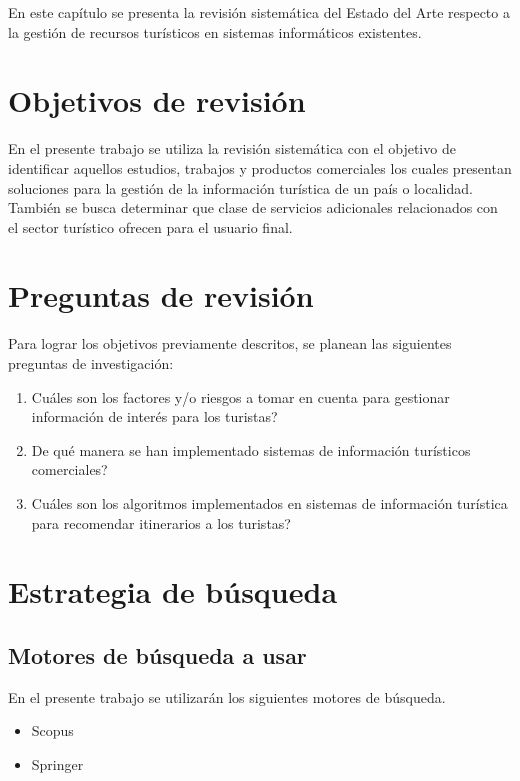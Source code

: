 \documentclass{report}
\begin{document}
En este capítulo se presenta la revisión sistemática del Estado del Arte
respecto a la gestión de recursos turísticos en sistemas informáticos existentes.

\section{Objetivos de revisión}

En el presente trabajo se utiliza la revisión sistemática con el objetivo de
identificar aquellos estudios, trabajos y productos comerciales los cuales presentan
soluciones para la gestión de la información turística de un país o localidad.
También se busca determinar que clase de servicios adicionales relacionados
con el sector turístico ofrecen para el usuario final.

\section{Preguntas de revisión}

Para lograr los objetivos previamente descritos, se planean las siguientes preguntas
de investigación:

\begin{enumerate}
    \item{Cuáles son los factores y/o riesgos a tomar en cuenta para gestionar
        información de interés para los turistas?}
    \item{De qué manera se han implementado sistemas de información turísticos
        comerciales?}
    \item{Cuáles son los algoritmos implementados en sistemas de información turística
        para recomendar itinerarios a los turistas?}
\end{enumerate}

\section{Estrategia de búsqueda}

\subsection{Motores de búsqueda a usar}

En el presente trabajo se utilizarán los siguientes motores de búsqueda.

\begin{itemize}
    \item{Scopus}
    \item{Springer}
\end{itemize}
\end{document}
